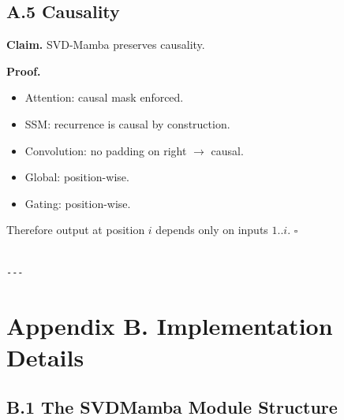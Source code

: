 \subsection{A.5 Causality}

\textbf{Claim.} SVD-Mamba preserves causality.

\textbf{Proof.} 
\begin{itemize}
\item Attention: causal mask enforced.
\item SSM: recurrence is causal by construction.
\item Convolution: no padding on right $\to$ causal.
\item Global: position-wise.
\item Gating: position-wise.

\end{itemize}
Therefore output at position $i$ depends only on inputs $1..i$. $\square$
\begin{lstlisting}

---
\end{lstlisting}


\section{Appendix B. Implementation Details}

\subsection{B.1 The SVDMamba Module Structure}

